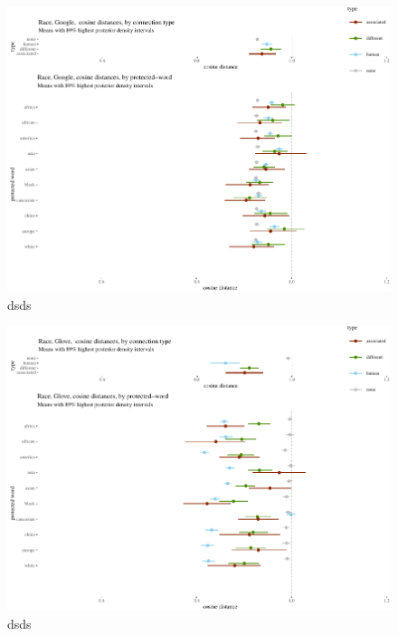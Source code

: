 \documentclass[
  10pt,
  dvipsnames,enabledeprecatedfontcommands]{scrartcl}
\begin{document}
\begin{figure}


\begin{center}\includegraphics[width=1.1\linewidth]{paperDraft6_files/figure-latex/unnamed-chunk-10-1} \end{center}
\caption{dsds}
\label{fig:raceGoogle}
\end{figure}

\begin{figure}


\begin{center}\includegraphics[width=1.1\linewidth]{paperDraft6_files/figure-latex/unnamed-chunk-11-1} \end{center}
\caption{dsds}
\label{fig:raceGlove}
\end{figure}
\end{document}
